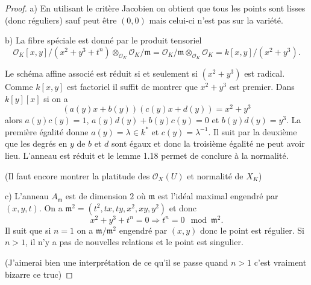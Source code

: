 \documentclass[A4, 11pt]{article}
\begin{document}
\begin{proof}
a) En utilisant le critère Jacobien on obtient que tous les points sont lisses (donc réguliers) sauf peut être $(0,0)$ mais celui-ci n'est pas sur la variété.

b) La fibre spéciale est donné par le produit tensoriel
$$\mathcal{O}_K [x,y]/(x^2+y^3+t^n)\otimes_{\mathcal{O}_K} \mathcal{O}_K/\mathfrak{m}=\mathcal{O}_K/\mathfrak{m} \otimes_{\mathcal{O}_K} \mathcal{O}_K = k[x,y]/(x^2+y^3).$$

Le schéma affine associé est réduit si et seulement si $(x^2+y^3)$ est radical. Comme $k[x,y]$ est factoriel il suffit de montrer que $x^2+y^3$ est premier. Dans $k[y][x]$ si on a
$$(a(y)x+b(y))(c(y)x+d(y))=x^2+y^3$$
alors $a(y)c(y)=1$, $a(y)d(y)+b(y)c(y)=0$ et $b(y)d(y)=y^3$. 
La première égalité donne $a(y)=\lambda\in k^*$ et $c(y)=\lambda^{-1}$. Il suit par la deuxième que les degrés en $y$ de $b$ et $d$ sont égaux et donc la troisième égalité ne peut avoir lieu. L'anneau est réduit et le lemme 1.18 permet de conclure à la normalité. 


(Il faut encore montrer la platitude des $\mathcal{O}_X(U)$ et normalité de $X_K$)

c) L'anneau $A_{\mathfrak{m}}$ est de dimension $2$ où $\mathfrak{m}$ est l'idéal maximal engendré par $(x,y,t)$. On a $\mathfrak{m}^2=(t^2,tx,ty,x^2,xy,y^2)$ et donc
$$x^2+y^3+t^n=0 \Rightarrow t^n=0 \mod \mathfrak{m}^2.$$
Il suit que si $n=1$ on a $\mathfrak{m}/\mathfrak{m^2}$ engendré par $(x,y)$ donc le point est régulier. Si $n>1$, il n'y a pas de nouvelles relations et le point est singulier. 

(J'aimerai bien une interprétation de ce qu'il se passe quand $n>1$ c'est vraiment bizarre ce truc)
\end{proof}
\end{document}
